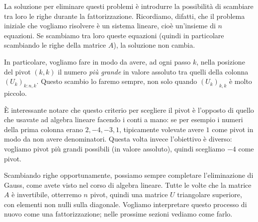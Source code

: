 \documentclass[a4paper]{report}
\theoremstyle{definition}
\theoremstyle{remark}
\begin{document}
La soluzione per eliminare questi problemi è introdurre la possibilità di scambiare tra loro le righe durante la fattorizzazione. Ricordiamo, difatti, che il problema iniziale che vogliamo risolvere è un sistema lineare, cioè un'insieme di $n$ equazioni. Se scambiamo tra loro queste equazioni (quindi in particolare scambiando le righe della matrice $A$), la soluzione non cambia.

In particolare, vogliamo fare in modo da avere, ad ogni passo $k$, nella posizione del pivot $(k,k)$ il numero \emph{più grande} in valore assoluto tra quelli della colonna $(U_k)_{k:n,k}$. Questo scambio lo faremo sempre, non solo quando $(U_k)_{k,k}$ è molto piccolo.

È interessante notare che questo criterio per scegliere il pivot è l'opposto di quello che usavate ad algebra lineare facendo i conti a mano: se per esempio i numeri della prima colonna erano $2,-4,-3,1$, tipicamente volevate avere $1$ come pivot in modo da non avere denominatori. Questa volta invece l'obiettivo è diverso: vogliamo pivot più grandi possibili (in valore assoluto), quindi scegliamo $-4$ come pivot.

Scambiando righe opportunamente, possiamo sempre completare l'eliminazione di Gauss, come avete visto nel corso di algebra lineare. Tutte le volte che la matrice $A$ è invertibile, otterremo $n$ pivot, quindi una matrice $U$ triangolare superiore, con elementi non nulli sulla diagonale. Vogliamo interpretare questo processo di nuovo come una fattorizzazione; nelle prossime sezioni vediamo come farlo.
\end{document}
